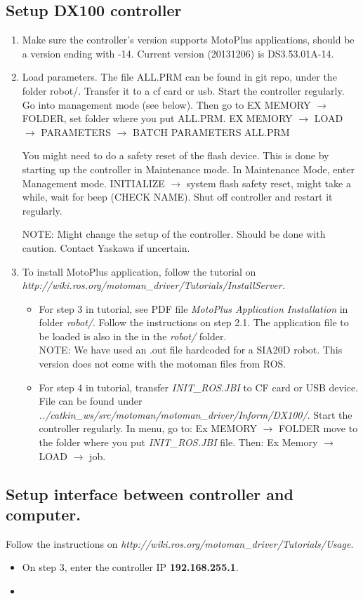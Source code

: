\documentclass[10pt,a4paper]{article}
\begin{document}
\subsection{Setup DX100 controller}

\begin{enumerate}

\item Make sure the controller’s version supports MotoPlus applications, should be a version ending with -14.
 Current version (20131206) is DS3.53.01A-14. 

\item Load parameters.
The file ALL.PRM can be found in git repo, under the folder robot/. Transfer it to a cf card or usb.
Start the controller regularly.
Go into management mode (see below).
Then go to EX MEMORY $\rightarrow$ FOLDER, set folder where you put ALL.PRM.
EX MEMORY $\rightarrow$ LOAD $\rightarrow$ PARAMETERS $\rightarrow$ BATCH PARAMETERS ALL.PRM

You might need to do a safety reset of the flash device. 
This is done by starting up the controller in Maintenance mode.   
In Maintenance Mode, enter Management mode.
INITIALIZE $\rightarrow$ system flash safety reset, might take a while, wait for beep (CHECK NAME). 
Shut off controller and restart it regularly.


NOTE: Might change the setup of the controller. Should be done with caution. Contact 	
Yaskawa if uncertain.
 

\item To install MotoPlus application, follow the tutorial on \textit{http://wiki.ros.org/motoman\_driver/Tutorials/InstallServer.}
\begin{itemize}

\item For step 3 in tutorial, see PDF file \textit{MotoPlus Application Installation} in folder \textit{robot/}. 
Follow the instructions on step 2.1. 
The application file to be loaded is also in the in the \textit{robot/} folder.\\

NOTE: We have used an .out file hardcoded for a SIA20D robot. This version does not come with the motoman files from ROS.\\


\item For step 4 in tutorial, transfer \textit{INIT\_ROS.JBI} to CF card or USB device. 
File can be found under \textit{../catkin\_ws/src/motoman/motoman\_driver/Inform/DX100/}. 
Start the controller regularly. In menu, go to: 
Ex MEMORY $\rightarrow$ FOLDER move to the folder where you put \textit{INIT\_ROS.JBI} file. Then:
Ex Memory $\rightarrow$ LOAD $\rightarrow$ job.
\end{itemize}


\end{enumerate}

\subsection{Setup interface between controller and computer.}
Follow the instructions on \textit{http://wiki.ros.org/motoman\_driver/Tutorials/Usage}.
\begin{itemize}


\item On step 3, enter the controller IP \textbf{192.168.255.1}.

\item  
\end{itemize}
\end{document}
